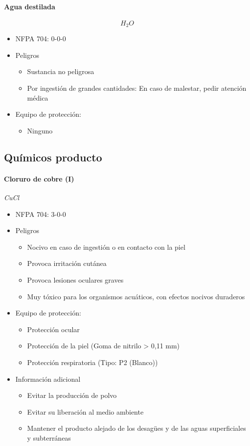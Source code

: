 \paragraph{Agua destilada} \textit{$$H_2O$$} \cite{h2o}
\begin{itemize}
    \item NFPA 704: 0-0-0 \cite{nfpa704}
    \item Peligros
    \begin{itemize}
        \item Sustancia no peligrosa
        \item Por ingestión de grandes cantidades: En caso de malestar, pedir 
atención médica
    \end{itemize}
    \item Equipo de protección: 
    \begin{itemize}
        \item Ninguno
    \end{itemize}
\end{itemize}


\subsection{Químicos producto}
\paragraph{Cloruro de cobre (I)} \textit{CuCl} \cite{cucl}
\begin{itemize}
    \item NFPA 704: 3-0-0 \cite{nfpa704}
    \item Peligros
    \begin{itemize}
        \item Nocivo en caso de ingestión o en contacto con la piel
        \item Provoca irritación cutánea
        \item Provoca lesiones oculares graves
        \item Muy tóxico para los organismos acuáticos, con efectos nocivos duraderos
    \end{itemize}
    \item Equipo de protección: 
    \begin{itemize}
        \item Protección ocular
        \item Protección de la piel (Goma de nitrilo > 0,11 mm)
        \item Protección respiratoria (Tipo: P2 \cite{abek} (Blanco))
    \end{itemize}
    \item Información adicional
    \begin{itemize}
        \item Evitar la producción de polvo
        \item Evitar su liberación al medio ambiente
        \item Mantener el producto alejado de los desagües y de las aguas superficiales y subterráneas
    \end{itemize}
\end{itemize}

